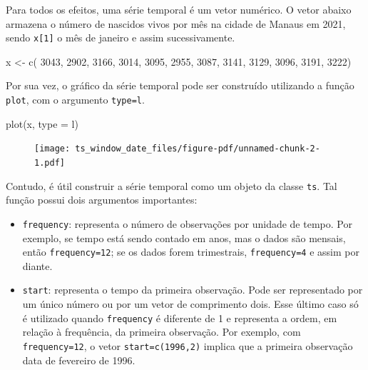 \documentclass[
  letterpaper,
  DIV=11,
  numbers=noendperiod]{scrreprt}
\newenvironment{Shaded}{\begin{snugshade}}{\end{snugshade}}
\newcommand{\AttributeTok}[1]{\textcolor[rgb]{0.40,0.45,0.13}{#1}}
\newcommand{\DecValTok}[1]{\textcolor[rgb]{0.68,0.00,0.00}{#1}}
\newcommand{\FunctionTok}[1]{\textcolor[rgb]{0.28,0.35,0.67}{#1}}
\newcommand{\NormalTok}[1]{\textcolor[rgb]{0.00,0.23,0.31}{#1}}
\newcommand{\OtherTok}[1]{\textcolor[rgb]{0.00,0.23,0.31}{#1}}
\newcommand{\StringTok}[1]{\textcolor[rgb]{0.13,0.47,0.30}{#1}}
\theoremstyle{plain}
\theoremstyle{definition}
\theoremstyle{definition}
\theoremstyle{remark}
\begin{document}
Para todos os efeitos, uma série temporal é um vetor numérico. O vetor
abaixo armazena o número de nascidos vivos por mês na cidade de Manaus
em 2021, sendo \texttt{x{[}1{]}} o mês de janeiro e assim
sucessivamente.

\begin{Shaded}
\begin{Highlighting}[]
\NormalTok{x }\OtherTok{\textless{}{-}} \FunctionTok{c}\NormalTok{( }\DecValTok{3043}\NormalTok{, }\DecValTok{2902}\NormalTok{, }\DecValTok{3166}\NormalTok{, }\DecValTok{3014}\NormalTok{, }\DecValTok{3095}\NormalTok{, }\DecValTok{2955}\NormalTok{, }\DecValTok{3087}\NormalTok{, }\DecValTok{3141}\NormalTok{,}
\DecValTok{3129}\NormalTok{, }\DecValTok{3096}\NormalTok{, }\DecValTok{3191}\NormalTok{, }\DecValTok{3222}\NormalTok{)}
\end{Highlighting}
\end{Shaded}

Por sua vez, o gráfico da série temporal pode ser construído utilizando
a função \texttt{plot}, com o argumento
\texttt{type=\textquotesingle{}l\textquotesingle{}}.

\begin{Shaded}
\begin{Highlighting}[]
\FunctionTok{plot}\NormalTok{(x, }\AttributeTok{type =} \StringTok{\textquotesingle{}l\textquotesingle{}}\NormalTok{)}
\end{Highlighting}
\end{Shaded}

\begin{figure}[H]

{\centering \texttt{[image: ts\_window\_date\_files/figure-pdf/unnamed-chunk-2-1.pdf]}

}

\end{figure}

Contudo, é útil construir a série temporal como um objeto da classe
\texttt{ts}. Tal função possui dois argumentos importantes:

\begin{itemize}
\item
  \texttt{frequency}: representa o número de observações por unidade de
  tempo. Por exemplo, se tempo está sendo contado em anos, mas o dados
  são mensais, então \texttt{frequency=12}; se os dados forem
  trimestrais, \texttt{frequency=4} e assim por diante.
\item
  \texttt{start}: representa o tempo da primeira observação. Pode ser
  representado por um único número ou por um vetor de comprimento dois.
  Esse último caso só é utilizado quando \texttt{frequency} é diferente
  de 1 e representa a ordem, em relação à frequência, da primeira
  observação. Por exemplo, com \texttt{frequency=12}, o vetor
  \texttt{start=c(1996,2)} implica que a primeira observação data de
  fevereiro de 1996.
\end{itemize}
\end{document}
